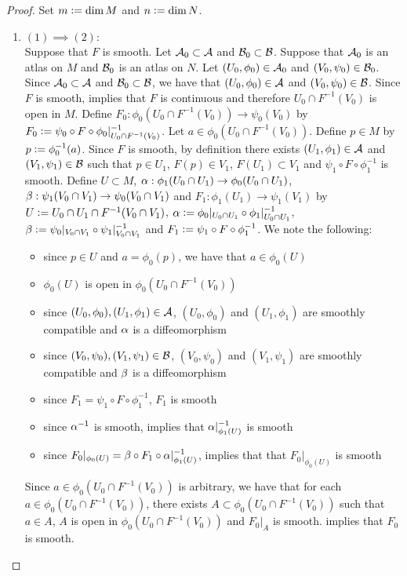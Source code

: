 \documentclass{book}
\begin{document}
\begin{proof} Set $m \vcentcolon= \dim M$ and $n \vcentcolon= \dim N$.
	\begin{enumerate}
		\item $(1) \implies (2)$: \\
		Suppose that $F$ is smooth. Let $\mathcal{A}_0 \subset \mathcal{A}$ and $\mathcal{B}_0 \subset \mathcal{B}$. Suppose that $\mathcal{A}_0$ is an atlas on $M$ and $\mathcal{B}_0$ is an atlas on $N$. Let $(U_0, \phi_0) \in \mathcal{A}_0$ and $(V_0, \psi_0) \in \mathcal{B}_0$. Since $\mathcal{A}_0 \subset \mathcal{A}$ and $\mathcal{B}_0 \subset \mathcal{B}$, we have that $(U_0, \phi_0) \in \mathcal{A}$ and $(V_0, \psi_0) \in \mathcal{B}$. Since $F$ is smooth,  implies that $F$ is continuous and therefore $U_0 \cap F^{-1}(V_0)$ is open in $M$. Define $F_0:\phi_0(U_0 \cap F^{-1}(V_0)) \rightarrow \psi_0(V_0)$ by $F_0 \vcentcolon= \psi_0 \circ F \circ \phi_0|_{U_0 \cap F^{-1}(V_0)}^{-1}$. Let $a \in \phi_0(U_0 \cap F^{-1}(V_0))$. Define $p \in M$ by $p \vcentcolon= \phi_0^{-1}(a)$. Since $F$ is smooth, by definition 
		there exists $(U_1, \phi_1) \in \mathcal{A}$ and $(V_1, \psi_1) \in \mathcal{B}$ such that $p \in U_1$, $F(p) \in V_1$, $F(U_1) \subset V_1$ and $\psi_1 \circ F \circ \phi_1^{-1}$ is smooth. Define $U \subset M$, $\alpha: \phi_1(U_0 \cap U_1) \rightarrow \phi_0(U_0 \cap U_1)$, $\beta: \psi_1(V_0 \cap V_1) \rightarrow \psi_0(V_0 \cap V_1)$ and $F_1: \phi_1(U_1) \rightarrow \psi_1(V_1)$ by $U \vcentcolon= U_0 \cap U_1 \cap F^{-1}(V_0 \cap V_1)$, $\alpha \vcentcolon= \phi_0|_{U_0 \cap U_1} \circ \phi_1|_{U_0 \cap U_1}^{-1}$, $\beta \vcentcolon= \psi_0|_{V_0 \cap V_1} \circ \psi_1|_{V_0 \cap V_1}^{-1}$ and $F_1 \vcentcolon= \psi_1 \circ F \circ \phi_1^{-1}$.
		 We note the following:
		\begin{itemize}
			\item since $p \in U$ and $a = \phi_0(p)$, we have that $a \in \phi_0(U)$
			\item $\phi_0(U)$ is open in $\phi_0(U_0 \cap F^{-1}(V_0))$
			\item since $(U_0, \phi_0), (U_1, \phi_1) \in \mathcal{A}$, $(U_0, \phi_0)$ and $(U_1, \phi_1)$ are smoothly compatible and $\alpha$ is a diffeomorphism
			\item since $(V_0, \psi_0), (V_1, \psi_1) \in \mathcal{B}$, $(V_0, \psi_0)$ and $(V_1, \psi_1)$ are smoothly compatible and $\beta$ is a diffeomorphism
			\item since $F_1 = \psi_1 \circ F \circ \phi_1^{-1}$, $F_1$ is smooth
			\item since $\alpha^{-1}$ is smooth,  implies that $ \alpha|_{\phi_1(U)}^{-1}$ is smooth
			\item since $F_0|_{\phi_0(U)} = \beta \circ F_1 \circ \alpha|_{\phi_1(U)}^{-1}$,  implies that that $F_0|_{\phi_0(U)}$ is smooth
		\end{itemize}
		Since $a \in \phi_0(U_0 \cap F^{-1}(V_0))$ is arbitrary, we have that for each $a \in \phi_0(U_0 \cap F^{-1}(V_0))$, there exists $A \subset \phi_0(U_0 \cap F^{-1}(V_0))$ such that $a \in A$, $A$ is open in $\phi_0(U_0 \cap F^{-1}(V_0))$ and $F_0|_A$ is smooth.  implies that $F_0$ is smooth. 
		

\end{enumerate}
\end{proof}
\end{document}
